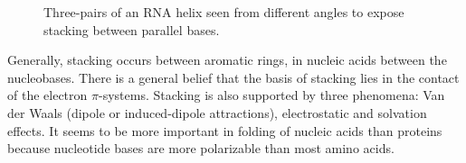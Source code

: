 \documentclass[12pt]{article}
\begin{document}
\begin{figure} [h!]
\begin{center}
\caption{Three-pairs of an RNA helix seen from different angles to expose  stacking between parallel bases.}
\label{StackingHelix}
\end{center}
\end{figure} 

Generally, stacking occurs between aromatic rings, in nucleic acids between the nucleobases. There is a general belief that the basis of stacking lies in the contact of the electron $\pi$-systems. Stacking is also supported by three phenomena: Van der Waals (dipole or induced-dipole attractions), electrostatic and solvation effects. It seems to be more important in folding of nucleic acids than proteins because nucleotide bases are more polarizable than most amino acids. 

\end{document}
